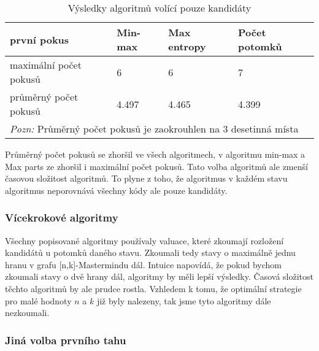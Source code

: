 \begin{table}[h]
\centering
\begin{tabular}{l l l l}
\toprule
první pokus & Min-max & Max entropy & Počet potomků  \\
\midrule

maximální počet pokusů 
& 6 & 6 & 7  \\

průměrný počet pokusů 
& 4.497 & 4.465 & 4.399 \\
\bottomrule
\multicolumn{4}{l}{\footnotesize \textit{Pozn:}
Průměrný počet pokusů je zaokrouhlen na $3$ desetinná místa}
\end{tabular}
\caption{Výsledky algoritmů volící pouze kandidáty}\label{tabminmaxvysl}
\end{table}

Průměrný počet pokusů se zhoršil ve všech algoritmech, v algoritmu min-max a Max parts ze zhoršil i maximální počet pokusů. Tato volba algoritmů ale zmenší časovou složitost algoritmů. To plyne z toho, že algoritmus v každém stavu algoritmus neporovnává všechny kódy ale pouze kandidáty. 


\subsubsection{Vícekrokové algoritmy}
Všechny popisované algoritmy používaly valuace, které zkoumají rozložení kandidátů u potomků daného stavu. Zkoumali tedy stavy o maximálně jednu hranu v grafu [n,k]-Mastermindu dál. Intuice napovídá, že pokud bychom zkoumali stavy o dvě hrany dál, algoritmy by měli lepší výsledky. Časová složitost těchto algoritmů by ale prudce rostla. Vzhledem k tomu, že optimální strategie pro malé hodnoty $n$ a $k$ již byly nalezeny, tak jsme tyto algoritmy dále nezkoumali. 




\subsubsection{Jiná volba prvního tahu}



